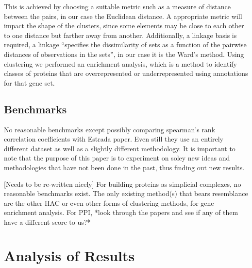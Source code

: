 \documentclass[9pt]{article}
\begin{document}
This is achieved by choosing a suitable metric such as a measure of distance between the pairs, in our case the Euclidean distance. A appropriate metric will impact the shape of the clusters, since some elements may be close to each other to one distance but farther away from another. Additionally, a linkage basis is required, a linkage “specifies the dissimilarity of sets as a function of the pairwise distances of observations in the sets”, in our case it is the Ward’s method.  Using clustering we performed an enrichment analysis, which is a method to identify classes of proteins that are overrepresented or underrepresented using annotations for that gene set. 

\subsection{Benchmarks}
No reasonable benchmarks except possibly comparing spearman’s rank correlation coefficients with Estrada paper. Even still they use an entirely different dataset as well as a slightly different methodology. It is important to note that the purpose of this paper is to experiment on soley new ideas and methodologies that have not been done in the past, thus finding out new results.  

[Needs to be re-written nicely]
For building proteins as simplicial complexes, no reasonable benchmarks exist. The only existing method(s) that bears resemblance are the other HAC or even other forms of clustering methods, for gene enrichment analysis. 
For PPI, *look through the papers and see if any of them have a different score to us?*

\newpage
\section{Analysis of Results}
\end{document}

